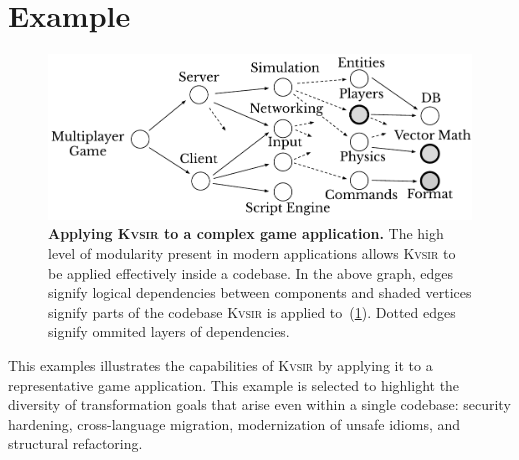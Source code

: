 \documentclass[sigplan,review,anonymous,10pt]{acmart}
\newcommand{\sys}{{\scshape Kv{\textalpha}sir}\xspace}
\begin{document}

\section{Example}
\label{sec:example}

\begin{figure}[t]
\centering
  \includegraphics[width=.9\columnwidth]{figs/kvasir_application.pdf}
  \caption{\textbf{Applying \sys to a complex game application.}
  The high level of modularity present in modern applications allows \sys to be applied effectively inside a codebase.
  In the above graph, edges signify logical dependencies between components 
  and shaded vertices signify parts of the codebase \sys is applied to~(\cref{sec:example}).
  Dotted edges signify ommited layers of dependencies.
  }
  \label{fig:ex-large-app}
\end{figure}

This examples illustrates the capabilities of \sys by applying it to a representative game
application.
This example is selected to highlight the
diversity of transformation goals that arise even within a single codebase:
security hardening, cross-language migration, modernization of unsafe idioms,
and structural refactoring.
\end{document}
